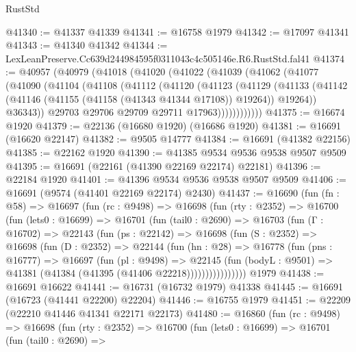 \begin{lexlean}{RustStd}
\begin{coremodule}
@41340 := @41337 @41339
@41341 := @16758 @1979
@41342 := @17097 @41341
@41343 := @41340 @41342
@41344 := LexLeanPreserve.Cc639d244984595f0311043c4c505146e.R6.RustStd.fal41
@41374 := @40957
    (@40979
      (@41018
        (@41020
          (@41022
            (@41039
              (@41062
                (@41077
                  (@41090
                    (@41104
                      (@41108
                        (@41112
                          (@41120
                            (@41123
                              (@41129
                                (@41133
                                  (@41142
                                    (@41146 (@41155 (@41158 (@41343 @41344 @17108)) @19264))
                                    @19264))
                                @36343))
                            @29703
                            @29706
                            @29709
                            @29711
                            @17963))))))))))))
@41375 := @16674 @1920
@41379 := @22136 (@16680 @1920) (@16686 @1920)
@41381 := @16691 (@16620 @22147)
@41382 := @9505 @14777
@41384 := @16691 (@41382 @22156)
@41385 := @22162 @1920
@41390 := @41385 @9534 @9536 @9538 @9507 @9509
@41395 := @16691 (@22161 (@41390 @22169 @22174) @22181)
@41396 := @22184 @1920
@41401 := @41396 @9534 @9536 @9538 @9507 @9509
@41406 := @16691 (@9574 (@41401 @22169 @22174) @2430)
@41437 := @16690
    (fun (fn : @58) =>
    @16697
      (fun (rc : @9498) =>
      @16698
        (fun (rty : @2352) =>
        @16700
          (fun (lets0 : @16699) =>
          @16701
            (fun (tail0 : @2690) =>
            @16703
              (fun (Γ : @16702) =>
              @22143
                (fun (ps : @22142) =>
                @16698
                  (fun (S : @2352) =>
                  @16698
                    (fun (D : @2352) =>
                    @22144
                      (fun (hn : @28) =>
                      @16778
                        (fun (pns : @16777) =>
                        @16697
                          (fun (pl : @9498) =>
                          @22145
                            (fun (bodyL : @9501) =>
                            @41381 (@41384 (@41395 (@41406 @22218))))))))))))))))
    @1979
@41438 := @16691 @16622
@41441 := @16731 (@16732 @1979) @41338
@41445 := @16691 (@16723 (@41441 @22200) @22204)
@41446 := @16755 @1979
@41451 := @22209 (@22210 @41446 @41341 @22171 @22173)
@41480 := @16860
    (fun (rc : @9498) =>
    @16698
      (fun (rty : @2352) =>
      @16700
        (fun (lets0 : @16699) =>
        @16701
          (fun (tail0 : @2690) =>

\end{coremodule}
\end{lexlean}
